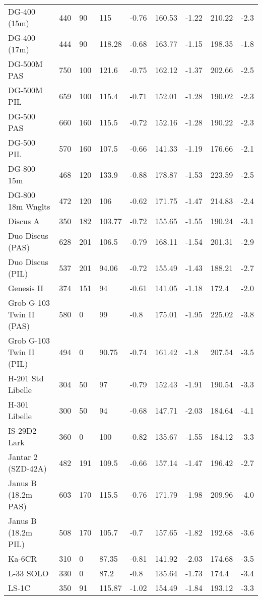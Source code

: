 \begin{maxipage}
\begin{small}
\begin{longtable}{l l l l l l l l l}
DG-400 (15m) & 440 & 90 & 115 & -0.76 & 160.53 & -1.22 & 210.22 & -2.3 \\
DG-400 (17m) & 444 & 90 & 118.28 & -0.68 & 163.77 & -1.15 & 198.35 & -1.8 \\
DG-500M PAS & 750 & 100 & 121.6 & -0.75 & 162.12 & -1.37 & 202.66 & -2.5 \\
DG-500M PIL & 659 & 100 & 115.4 & -0.71 & 152.01 & -1.28 & 190.02 & -2.3 \\
DG-500 PAS & 660 & 160 & 115.5 & -0.72 & 152.16 & -1.28 & 190.22 & -2.3 \\
DG-500 PIL & 570 & 160 & 107.5 & -0.66 & 141.33 & -1.19 & 176.66 & -2.1 \\
DG-800 15m & 468 & 120 & 133.9 & -0.88 & 178.87 & -1.53 & 223.59 & -2.5 \\
DG-800 18m Wnglts & 472 & 120 & 106 & -0.62 & 171.75 & -1.47 & 214.83 & -2.4 \\
Discus A & 350 & 182 & 103.77 & -0.72 & 155.65 & -1.55 & 190.24 & -3.1 \\
Duo Discus (PAS) & 628 & 201 & 106.5 & -0.79 & 168.11 & -1.54 & 201.31 & -2.9 \\
Duo Discus (PIL) & 537 & 201 & 94.06 & -0.72 & 155.49 & -1.43 & 188.21 & -2.7 \\
Genesis II & 374 & 151 & 94 & -0.61 & 141.05 & -1.18 & 172.4 & -2.0 \\
Grob G-103 Twin II (PAS) & 580 & 0 & 99 & -0.8 & 175.01 & -1.95 & 225.02 & -3.8 \\
Grob G-103 Twin II (PIL) & 494 & 0 & 90.75 & -0.74 & 161.42 & -1.8 & 207.54 & -3.5 \\
H-201 Std Libelle & 304 & 50 & 97 & -0.79 & 152.43 & -1.91 & 190.54 & -3.3 \\
H-301 Libelle & 300 & 50 & 94 & -0.68 & 147.71 & -2.03 & 184.64 & -4.1 \\
IS-29D2 Lark & 360 & 0 & 100 & -0.82 & 135.67 & -1.55 & 184.12 & -3.3 \\
Jantar 2 (SZD-42A) & 482 & 191 & 109.5 & -0.66 & 157.14 & -1.47 & 196.42 & -2.7 \\
Janus B (18.2m PAS) & 603 & 170 & 115.5 & -0.76 & 171.79 & -1.98 & 209.96 & -4.0 \\
Janus B (18.2m PIL) & 508 & 170 & 105.7 & -0.7 & 157.65 & -1.82 & 192.68 & -3.6 \\
Ka-6CR & 310 & 0 & 87.35 & -0.81 & 141.92 & -2.03 & 174.68 & -3.5 \\
L-33 SOLO & 330 & 0 & 87.2 & -0.8 & 135.64 & -1.73 & 174.4 & -3.4 \\
LS-1C & 350 & 91 & 115.87 & -1.02 & 154.49 & -1.84 & 193.12 & -3.3 \\
\bottomrule
\end{longtable}
\end{small}
\end{maxipage}

